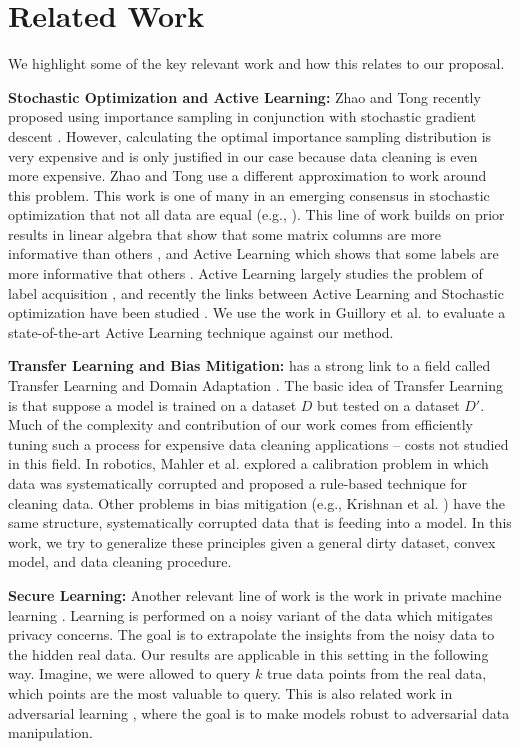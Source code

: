 \vspace{-2em}
\section{Related Work}
We highlight some of the key relevant work and how this relates to our proposal.

\noindent \textbf{Stochastic Optimization and Active Learning: } Zhao and Tong recently proposed using importance sampling in conjunction with stochastic gradient descent \cite{zhao2014stochastic}. 
However, calculating the optimal importance sampling distribution is very expensive and is only justified in our case because data cleaning is even more expensive. 
Zhao and Tong use a different approximation to work around this problem. 
This work is one of many in an emerging consensus in stochastic optimization that not all data are equal (e.g., \cite{qu2014randomized}). 
This line of work builds on prior results in linear algebra that show that some matrix columns are more informative than others \cite{drineas2012fast}, and Active Learning which shows that some labels are more informative that others \cite{settles2010active}.
Active Learning largely studies the problem of label acquisition \cite{settles2010active},
and recently the links between Active Learning and Stochastic optimization have been studied \cite{guillory2009active}. 
We use the work in Guillory et al. to evaluate a state-of-the-art Active Learning technique against our method.

\noindent \textbf{Transfer Learning and Bias Mitigation: }  
\sys has a strong link to a field called Transfer Learning and Domain Adaptation \cite{pan2010survey}. The basic idea of Transfer Learning is that suppose a model is trained on a dataset $D$ but tested on a dataset $D'$. Much of the complexity and contribution of our work comes from efficiently tuning such a process for expensive data cleaning applications -- costs not studied in this field.
In robotics, Mahler et al. explored a calibration problem in which data was systematically corrupted \cite{DBLP:conf/case/MahlerKLSMKPWFAG14} and proposed a rule-based technique for cleaning data.
Other problems in bias mitigation (e.g., Krishnan et al. \cite{DBLP:conf/recsys/KrishnanPFG14}) have the same structure, systematically corrupted data that is feeding into a model.
In this work, we try to generalize these principles given a general dirty dataset, convex model, and data cleaning procedure.

\noindent \textbf{Secure Learning: } Another relevant line of work is the work in private machine learning  \cite{wainwright2012privacy, duchi2013local}. Learning is performed on a noisy variant of the data which mitigates privacy concerns. The goal is to extrapolate the insights from the noisy data to the hidden real data. Our results are applicable in this setting in the following way. Imagine, we were allowed to query $k$ true data points from the real data, which points are the most valuable to query. This is also related work in adversarial learning \cite{nelson2012query}, where the goal is to make models robust to adversarial data manipulation.


